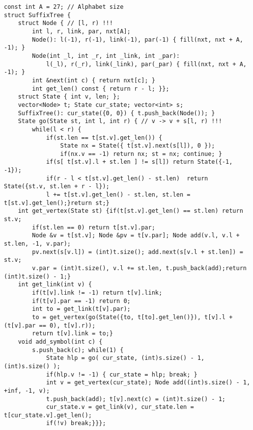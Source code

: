 \documentclass[a4paper,12pt]{article}
\begin{document}
\begin{verbatim}
const int A = 27; // Alphabet size
struct SuffixTree {
    struct Node { // [l, r) !!!
        int l, r, link, par, nxt[A];
        Node(): l(-1), r(-1), link(-1), par(-1) { fill(nxt, nxt + A, -1); }
        Node(int _l, int _r, int _link, int _par): 
            l(_l), r(_r), link(_link), par(_par) { fill(nxt, nxt + A, -1); }
        int &next(int c) { return nxt[c]; }
        int get_len() const { return r - l; }};
    struct State { int v, len; };
    vector<Node> t; State cur_state; vector<int> s;
    SuffixTree(): cur_state({0, 0}) { t.push_back(Node()); }
    State go(State st, int l, int r) { // v -> v + s[l, r) !!!
        while(l < r) {
            if(st.len == t[st.v].get_len()) {
                State nx = State({ t[st.v].next(s[l]), 0 });
                if(nx.v == -1) return nx; st = nx; continue; }
            if(s[ t[st.v].l + st.len ] != s[l]) return State({-1, -1});
            if(r - l < t[st.v].get_len() - st.len)  return State({st.v, st.len + r - l});
            l += t[st.v].get_len() - st.len, st.len = t[st.v].get_len();}return st;}
    int get_vertex(State st) {if(t[st.v].get_len() == st.len) return st.v;
        if(st.len == 0) return t[st.v].par;
        Node &v = t[st.v]; Node &pv = t[v.par]; Node add(v.l, v.l + st.len, -1, v.par);
        pv.next(s[v.l]) = (int)t.size(); add.next(s[v.l + st.len]) = st.v;
        v.par = (int)t.size(), v.l += st.len, t.push_back(add);return (int)t.size() - 1;}
    int get_link(int v) {
        if(t[v].link != -1) return t[v].link;
        if(t[v].par == -1) return 0;
        int to = get_link(t[v].par);
        to = get_vertex(go(State({to, t[to].get_len()}), t[v].l + (t[v].par == 0), t[v].r));
        return t[v].link = to;}
    void add_symbol(int c) {
        s.push_back(c); while(1) {
            State hlp = go( cur_state, (int)s.size() - 1, (int)s.size() );
            if(hlp.v != -1) { cur_state = hlp; break; }
            int v = get_vertex(cur_state); Node add((int)s.size() - 1, +inf, -1, v);
            t.push_back(add); t[v].next(c) = (int)t.size() - 1;
            cur_state.v = get_link(v), cur_state.len = t[cur_state.v].get_len();
            if(!v) break;}}};
\end{verbatim}
\end{document}
